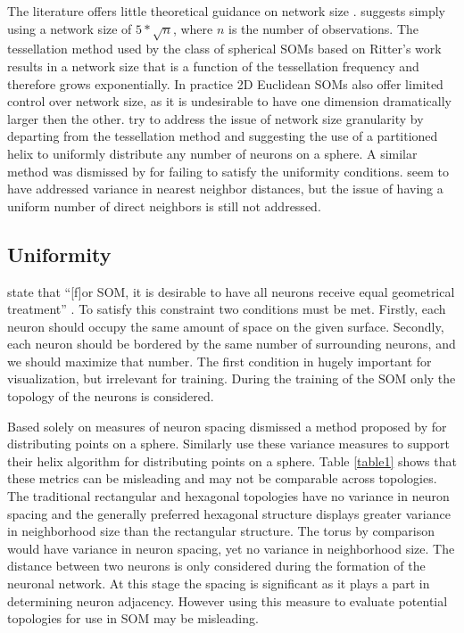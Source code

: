 \documentclass[11pt]{article}
\begin{document}
The literature offers little theoretical guidance on network size
\citep{cho1996}.  \cite{toolbox} suggests simply using a network size of
\(5*\sqrt {n}\), where \(n\) is the number of observations.  The tessellation
method used by the class of spherical SOMs based on Ritter's work results in a
network size that is a function of the tessellation frequency and therefore
grows exponentially. In practice 2D Euclidean SOMs also offer limited control
over network size, as it is undesirable to have one dimension dramatically
larger then the other.  \cite{Nishio:2006fk} try to address the issue of network
size granularity by departing from the tessellation method and suggesting the
use of a partitioned helix to uniformly distribute any number of neurons on a
sphere.  A similar method was dismissed by \cite{wu2005} for failing to satisfy
the uniformity conditions.  \citeauthor{Nishio:2006fk} seem to have addressed
variance in nearest neighbor distances, but the issue of having a uniform number
of direct neighbors is still not addressed.

\subsection{Uniformity}
\citeauthor{wu2006} state that ``[f]or SOM, it is desirable to have all neurons
receive equal geometrical treatment'' \cite[pp. 900]{wu2006}.  To satisfy this
constraint two conditions must be met.  Firstly, each neuron should occupy the
same amount of space on the given surface.  Secondly, each neuron should be
bordered by the same number of surrounding neurons, and we should maximize 
that number.  The first condition in hugely important for visualization, but 
irrelevant for training.  During the training of the SOM only the topology of the 
neurons is considered.

Based solely on measures of neuron spacing \cite{wu2005} dismissed a method
proposed by \cite{Rakhmanov94} for distributing points on a sphere.  Similarly
\cite{Nishio:2006fk} use these variance measures to support their helix
algorithm for distributing points on a sphere.  Table \ref{table1} shows that
these metrics can be misleading and may not be comparable across topologies.
The traditional rectangular and hexagonal topologies have no variance in neuron
spacing and the generally preferred hexagonal structure displays greater
variance in neighborhood size than the rectangular structure.  The torus by
comparison would have variance in neuron spacing, yet no variance in
neighborhood size.  The distance between two neurons is only considered during
the formation of the neuronal network.  At this stage the spacing is significant
as it plays a part in determining neuron adjacency. However using this measure
to evaluate potential topologies for use in SOM may be misleading.
\end{document}
